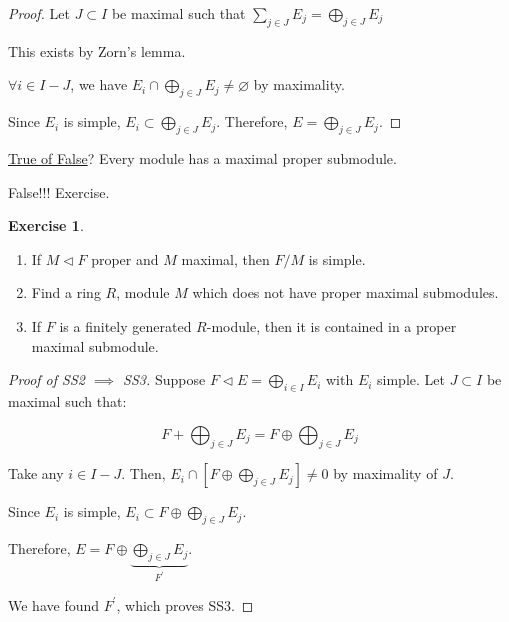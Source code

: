 \documentclass{article}
\theoremstyle{definition}
\newtheorem*{exercise}{Exercise}
\begin{document}
\begin{proof}
    Let \(J \subset I\) be maximal such that \(\sum_{j\in J} E_j = \bigoplus_{j\in J} E_j\)

    This exists by Zorn's lemma.

    \(\forall i\in I - J\), we have \(E_i \cap \bigoplus_{j\in J}E_j \neq \varnothing\) by maximality.

    Since \(E_i\) is simple, \(E_i \subset \bigoplus_{j\in J}E_j\). Therefore, \(E = \bigoplus_{j\in J} E_j\).

\end{proof}

\underline{True of False}? Every module has a maximal proper submodule.

False!!! Exercise.

\begin{exercise}
    \begin{enumerate}[label=\alph*)]
        \item If \(M \triangleleft F\) proper and \(M\) maximal, then \(F / M\) is simple. 
        \item Find a ring \(R\), module \(M\) which does not have proper maximal submodules.
        \item If \(F\) is a finitely generated \(R\)-module, then it is contained in a proper maximal submodule.
    \end{enumerate} 
\end{exercise}

\begin{proof}
    [Proof of SS2 \(\implies\) SS3]

    Suppose \(F \triangleleft E = \bigoplus_{i\in I}E_i\) with \(E_i\) simple. Let \(J \subset I\) be maximal such that:

    \[
        F + \bigoplus_{j\in J} E_j = F \oplus \bigoplus_{j\in J} E_j
    \]

    Take any \(i \in I - J\). Then, \(E_i \cap \left[ F \oplus \bigoplus_{j\in J} E_j \right] \neq 0\) by maximality of \(J\).

    Since \(E_i\) is simple, \(E_i \subset F \oplus \bigoplus_{j\in J}E_j\).

    Therefore, \(E = F \oplus \underbrace{\bigoplus_{j\in J}E_j}_{F^{\prime}}\).

    We have found \(F^{\prime}\), which proves SS3.

\end{proof}
\end{document}
